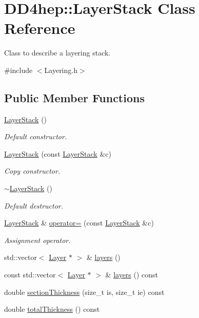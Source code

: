 \hypertarget{class_d_d4hep_1_1_layer_stack}{}\section{D\+D4hep\+:\+:Layer\+Stack Class Reference}
\label{class_d_d4hep_1_1_layer_stack}


Class to describe a layering stack.  




{\ttfamily \#include $<$Layering.\+h$>$}

\subsection*{Public Member Functions}
\begin{DoxyCompactItemize}
\item 
\hyperlink{class_d_d4hep_1_1_layer_stack_a802229c0f548c9e506b8fa6544d54563}{Layer\+Stack} ()
\begin{DoxyCompactList}\small\item\em Default constructor. \end{DoxyCompactList}\item 
\hyperlink{class_d_d4hep_1_1_layer_stack_a1eb37df2698ed881e8b3fe10fc418135}{Layer\+Stack} (const \hyperlink{class_d_d4hep_1_1_layer_stack}{Layer\+Stack} \&c)
\begin{DoxyCompactList}\small\item\em Copy constructor. \end{DoxyCompactList}\item 
\hyperlink{class_d_d4hep_1_1_layer_stack_a945f22b1f52e382128b80e16f56f68fa}{$\sim$\+Layer\+Stack} ()
\begin{DoxyCompactList}\small\item\em Default destructor. \end{DoxyCompactList}\item 
\hyperlink{class_d_d4hep_1_1_layer_stack}{Layer\+Stack} \& \hyperlink{class_d_d4hep_1_1_layer_stack_ae660afcfb9b79db69cc225dc5d748216}{operator=} (const \hyperlink{class_d_d4hep_1_1_layer_stack}{Layer\+Stack} \&c)
\begin{DoxyCompactList}\small\item\em Assignment operator. \end{DoxyCompactList}\item 
std\+::vector$<$ \hyperlink{class_d_d4hep_1_1_layer}{Layer} $\ast$ $>$ \& \hyperlink{class_d_d4hep_1_1_layer_stack_a66ac953919c08520ef1aa9da93f5aa1b}{layers} ()
\item 
const std\+::vector$<$ \hyperlink{class_d_d4hep_1_1_layer}{Layer} $\ast$ $>$ \& \hyperlink{class_d_d4hep_1_1_layer_stack_a6bbd4ebebb716ce98eb57e156b54c7fa}{layers} () const
\item 
double \hyperlink{class_d_d4hep_1_1_layer_stack_ae38858527f806b015bf6601c376a152d}{section\+Thickness} (size\+\_\+t is, size\+\_\+t ie) const
\item 
double \hyperlink{class_d_d4hep_1_1_layer_stack_aead65ad7a1ac06f4977cdcfbda6d65b5}{total\+Thickness} () const
\end{DoxyCompactItemize}
